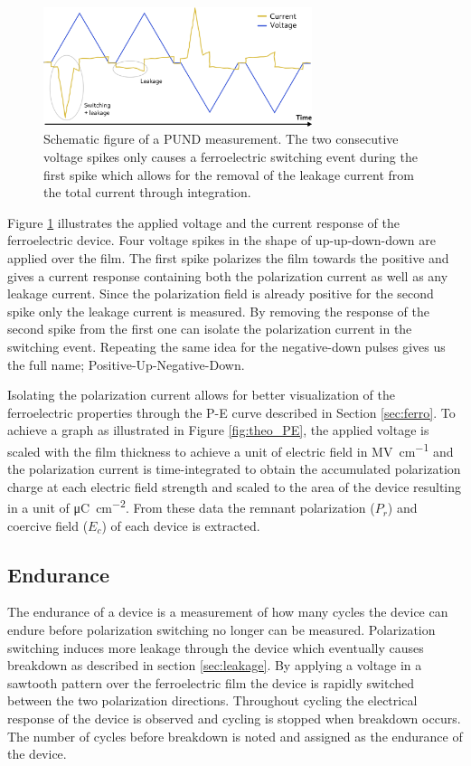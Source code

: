 \documentclass[11pt,twoside]{eitExjobb}
\begin{document}
\begin{figure}[htbp]
    \centering
    \includegraphics[width=0.70\textwidth]{fig/img/PUND.png}
    \caption{Schematic figure of a PUND measurement. The two consecutive
    voltage spikes only causes a ferroelectric switching event during the first
    spike which allows for the removal of the leakage current from the total
    current through integration.}
    \label{fig:char_PUND}
\end{figure}

Figure \ref{fig:char_PUND} illustrates the applied voltage and the current
response of the ferroelectric device. Four voltage spikes in the shape of
up-up-down-down are applied over the film. The first spike polarizes the film
towards the positive and gives a current response containing both the
polarization current as well as any leakage current. Since the polarization
field is already positive for the second spike only the leakage current is
measured. By removing the response of the second spike from the first one can
isolate the polarization current in the switching event. Repeating the same
idea for the negative-down pulses gives us the full name;
Positive-Up-Negative-Down.

Isolating the polarization current allows for better visualization of the
ferroelectric properties through the P-E curve described in Section
\ref{sec:ferro}. To achieve a graph as illustrated in Figure \ref{fig:theo_PE},
the applied voltage is scaled with the film thickness to achieve a unit of
electric field in \si{\mega\volt\per\centi\meter} and the polarization current
is time-integrated to obtain the accumulated polarization charge at each
electric field strength and scaled to the area of the device resulting in a
unit of \si{\micro\coulomb\per\centi\meter\squared}. From these data the
remnant polarization ($P_r$) and coercive field ($E_c$) of each device is
extracted.

\subsection{Endurance}\label{sec:Endu}
The endurance of a device is a measurement of how many cycles the device can
endure before polarization switching no longer can be measured. Polarization
switching induces more leakage through the device which eventually causes
breakdown as described in section \ref{sec:leakage}. By applying a voltage in a
sawtooth pattern over the ferroelectric film the device is rapidly switched
between the two polarization directions. Throughout cycling the electrical
response of the device is observed and cycling is stopped when breakdown
occurs. The number of cycles before breakdown is noted and assigned as the
endurance of the device.
\end{document}
